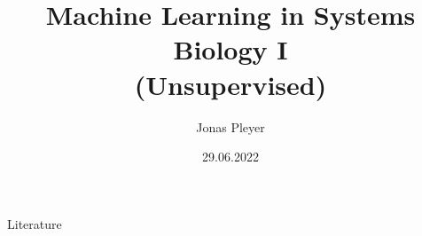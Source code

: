\documentclass[10pt, compress]{beamer}
\title{Machine Learning in Systems Biology I\\(Unsupervised)}
\subtitle{}
\date{29.06.2022}
\author{Jonas Pleyer}
\institute{Freiburg Center for Data Analysis and Modeling (FDM)}
\begin{document}
\maketitle







\begin{frame}{Literature}
    
    
\end{frame}
% 
%
\end{document}

